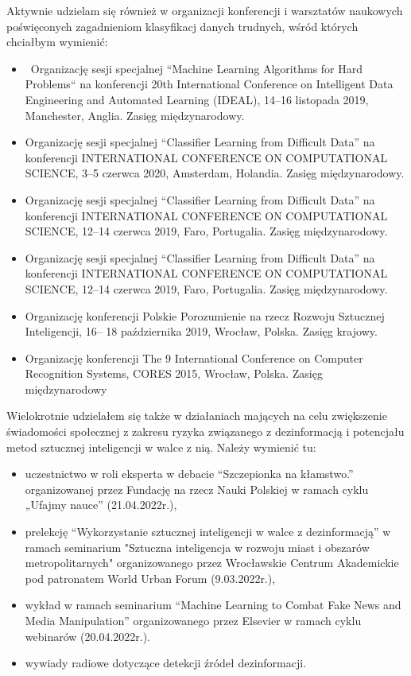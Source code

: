 Aktywnie udzielam się również w organizacji konferencji i warsztatów naukowych poświęconych zagadnieniom klasyfikacj danych trudnych, wśród których chciałbym wymienić:

\begin{itemize}
    \item \ Organizację sesji specjalnej “Machine Learning Algorithms for Hard Problems“ na konferencji 20th International Conference on Intelligent Data Engineering and Automated Learning (IDEAL), 14–16 listopada 2019, Manchester, Anglia. Zasięg międzynarodowy.
    \item Organizację sesji specjalnej “Classifier Learning from Difficult Data” na konferencji INTERNATIONAL CONFERENCE ON COMPUTATIONAL SCIENCE, 3–5 czerwca 2020, Amsterdam, Holandia. Zasięg międzynarodowy.
    \item Organizację sesji specjalnej “Classifier Learning from Difficult Data” na konferencji INTERNATIONAL CONFERENCE ON COMPUTATIONAL SCIENCE, 12–14 czerwca 2019, Faro, Portugalia. Zasięg międzynarodowy.
    \item Organizację sesji specjalnej “Classifier Learning from Difficult Data” na konferencji INTERNATIONAL CONFERENCE ON COMPUTATIONAL SCIENCE, 12–14 czerwca 2019, Faro, Portugalia. Zasięg międzynarodowy.
    \item Organizację konferencji Polskie Porozumienie na rzecz Rozwoju Sztucznej Inteligencji, 16– 18 października 2019, Wrocław, Polska. Zasięg krajowy.
    \item Organizację konferencji The 9 International Conference on Computer Recognition Systems, CORES 2015, Wrocław, Polska. Zasięg międzynarodowy
\end{itemize}

Wielokrotnie udzielałem się także w działaniach mających na celu zwiększenie świadomości społecznej z zakresu ryzyka związanego z dezinformacją i potencjału metod sztucznej inteligencji w walce z nią. Należy wymienić tu:

\begin{itemize}
    \item uczestnictwo w roli eksperta w debacie “Szczepionka na kłamstwo.” organizowanej przez Fundację na rzecz Nauki Polskiej w ramach cyklu „Ufajmy nauce” (21.04.2022r.),
    \item prelekcję “Wykorzystanie sztucznej inteligencji w walce z dezinformacją” w ramach seminarium "Sztuczna inteligencja w rozwoju miast i obszarów metropolitarnych" organizowanego przez Wrocławskie Centrum Akademickie pod patronatem World Urban Forum (9.03.2022r.),
    \item wykład w ramach seminarium “Machine Learning to Combat Fake News and Media Manipulation” organizowanego przez Elsevier w ramach cyklu webinarów (20.04.2022r.).
    \item wywiady radiowe dotyczące detekcji źródeł dezinformacji.
\end{itemize}

